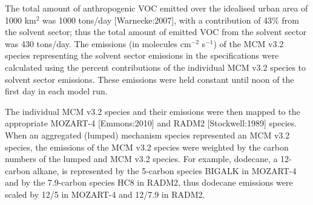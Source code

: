 \documentclass{article}
\begin{document}
The total amount of anthropogenic VOC emitted over the idealised urban area of 1000 km$^2$ was 1000 tons/day [Warnecke:2007], with a contribution of 43\% from the solvent sector; thus the total amount of emitted VOC from the solvent sector was 430 tons/day.
The emissions (in molecules cm$^{-2}$ s$^{-1}$) of the MCM v3.2 species representing the solvent sector emissions in the specifications were calculated using the percent contributions of the individual MCM v3.2 species to solvent sector emissions.
These emissions were held constant until noon of the first day in each model run.

The individual MCM v3.2 species and their emissions were then mapped to the appropriate MOZART-4 [Emmons:2010] and RADM2 [Stockwell:1989] species.
When an aggregated (lumped) mechanism species represented an MCM v3.2 species, the emissions of the MCM v3.2 species were weighted by the carbon numbers of the lumped and MCM v3.2 species.
For example, dodecane, a 12-carbon alkane, is represented by the 5-carbon species BIGALK in MOZART-4 and by the 7.9-carbon species HC8 in RADM2, thus dodecane emissions were scaled by 12/5 in MOZART-4 and 12/7.9 in RADM2.
\end{document}
